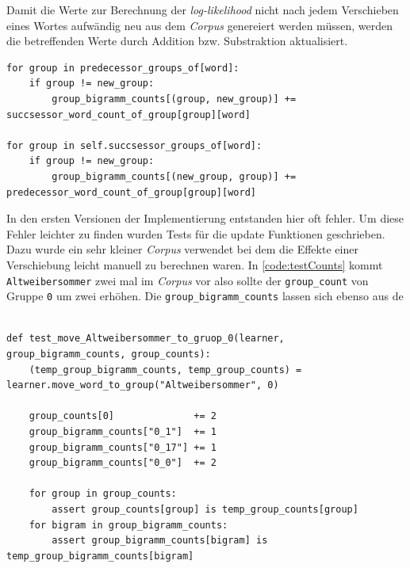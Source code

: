 		Damit die Werte zur Berechnung der \emph{log-likelihood} nicht nach jedem Verschieben eines Wortes aufwändig neu aus dem \emph{Corpus} genereiert werden müssen, werden die betreffenden Werte durch Addition bzw. Substraktion aktualisiert. \parencite[S. 26 f. Abschnitt 3.1.2]{speechcommunication:exchange}
            
        \newpage
        \begin{lstlisting}[caption=Beispiel für das Aktualisieren von \emph{counts} nachdem ein Wort zu einer Klasse hinzugefügt wurde.,label=code:countUpdate, captionpos=b]
for group in predecessor_groups_of[word]:
	if group != new_group:
        group_bigramm_counts[(group, new_group)] += succsessor_word_count_of_group[group][word]
 
for group in self.succsessor_groups_of[word]:
	if group != new_group:
        group_bigramm_counts[(new_group, group)] += predecessor_word_count_of_group[group][word]
        \end{lstlisting}
  
		In den ersten Versionen der Implementierung entstanden hier oft fehler. Um diese Fehler leichter zu finden wurden Tests für die update Funktionen geschrieben. Dazu wurde ein sehr kleiner \emph{Corpus} verwendet bei dem die Effekte einer Verschiebung leicht manuell zu berechnen waren. In \autoref{code:testCounts} kommt \texttt{Altweibersommer} zwei mal im \emph{Corpus} vor also sollte der \texttt{group\_count} von Gruppe \texttt{0} um zwei erhöhen. Die \texttt{group\_bigramm\_counts} lassen sich ebenso aus de

		\begin{lstlisting}[caption=Beispiel eines Tests zum Aktualisieren von \emph{counts} nachdem ein Wort einer Klasse hinzugefügt wurde., captionpos=b, label=code:testCounts]
                
def test_move_Altweibersommer_to_gruop_0(learner, group_bigramm_counts, group_counts):
    (temp_group_bigramm_counts, temp_group_counts) = learner.move_word_to_group("Altweibersommer", 0)

    group_counts[0]              += 2
    group_bigramm_counts["0_1"]  += 1
    group_bigramm_counts["0_17"] += 1
    group_bigramm_counts["0_0"]  += 2

    for group in group_counts:
        assert group_counts[group] is temp_group_counts[group]
    for bigram in group_bigramm_counts:
        assert group_bigramm_counts[bigram] is temp_group_bigramm_counts[bigram]
		\end{lstlisting}
                
